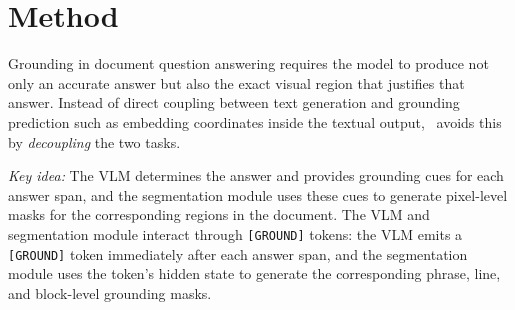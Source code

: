 


\section{Method}


Grounding in document question answering requires the model to produce not only an accurate answer but also the exact visual region that justifies that answer. Instead of direct coupling between text generation and grounding prediction such as embedding coordinates inside the textual output, \modelName\ avoids this by \textit{decoupling} the two tasks.

\noindent
\textit{Key idea:}
The VLM determines the answer and provides grounding cues for each answer span, and the segmentation module uses these cues to generate pixel-level masks for the corresponding regions in the document.
The VLM and segmentation module interact through \texttt{[GROUND]} tokens: the VLM emits a \texttt{[GROUND]} token immediately after each answer span, and the segmentation module uses the token’s hidden state to generate the corresponding phrase, line, and block-level grounding masks.


